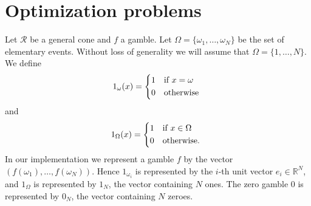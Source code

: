 \documentclass{article}
\theoremstyle{mytheorem}
\newcommand{\func}[1]{\ensuremath{\textsf{#1}}} %
\newcommand{\set}[1]{\ensuremath{\{ #1 \} }} %
\begin{document}


\clearpage
\section{Optimization problems}
Let $\mathcal{R}$ be a general cone and $f$ a gamble. Let $\Omega = \set{\omega_1, \ldots, \omega_N}$ be the set of elementary events. Without loss of generality we will assume that $\Omega = \set{1, \ldots, N}$. We define
\[
  1_\omega(x) =
  \begin{cases*}
    1 & if $x = \omega$ \\
    0 & otherwise
  \end{cases*}
\]
and
\[
  1_\Omega(x) =
  \begin{cases*}
    1 & if $x \in \Omega$ \\
    0 & otherwise.
  \end{cases*}
\]
In our implementation we represent a gamble $f$ by the vector $(f(\omega_1), \ldots, f(\omega_N))$. Hence $1_{\omega_i}$ is represented by the $i$-th unit vector $e_i \in \mathbb{R}^N$, and $1_\Omega$ is represented by $1_N$, the vector containing $N$ ones.
The zero gamble 0 is represented by $0_N$, the vector containing $N$ zeroes.
\end{document}
